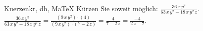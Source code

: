 \begin{MAufgabe}{Kuerzen}{kr, dh, MaTeX}
K\"urzen Sie soweit m\"oglich: $\frac{36\, x\, y^2}{63\, x\, y^2 - 18\, x\, y^2\, z}$.\\ 
\ifLsg\MLoesung
\quad $\frac{36\, x\, y^2}{63\, x\, y^2 - 18\, x\, y^2\, z}=\frac{(9\, x\, y^2)\cdot(4)}{(9\, x\, y^2)\cdot(7 - 2\, z)}=\frac{4}{7 - 2\, z}=\frac{-4}{2\, z - 7}$.\else\relax\fi
 \end{MAufgabe}